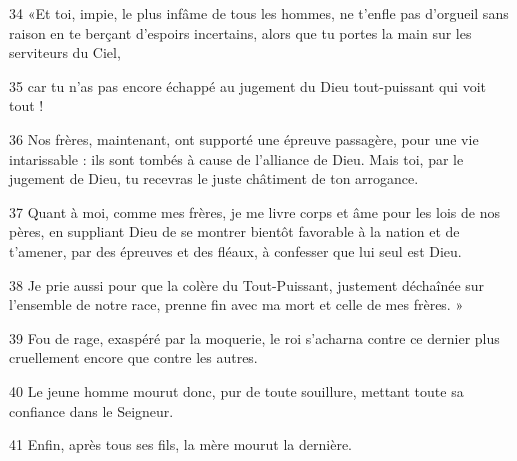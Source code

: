 
34 «Et toi, impie, le plus infâme de tous les hommes, ne t’enfle pas d’orgueil sans raison en te berçant d’espoirs incertains, alors que tu portes la main sur les serviteurs du Ciel,

35 car tu n’as pas encore échappé au jugement du Dieu tout-puissant qui voit tout !

36 Nos frères, maintenant, ont supporté une épreuve passagère, pour une vie intarissable : ils sont tombés à cause de l’alliance de Dieu. Mais toi, par le jugement de Dieu, tu recevras le juste châtiment de ton arrogance.

37 Quant à moi, comme mes frères, je me livre corps et âme pour les lois de nos pères, en suppliant Dieu de se montrer bientôt favorable à la nation et de t’amener, par des épreuves et des fléaux, à confesser que lui seul est Dieu.

38 Je prie aussi pour que la colère du Tout-Puissant, justement déchaînée sur l’ensemble de notre race, prenne fin avec ma mort et celle de mes frères. »

39 Fou de rage, exaspéré par la moquerie, le roi s’acharna contre ce dernier plus cruellement encore que contre les autres.

40 Le jeune homme mourut donc, pur de toute souillure, mettant toute sa confiance dans le Seigneur.

41 Enfin, après tous ses fils, la mère mourut la dernière.